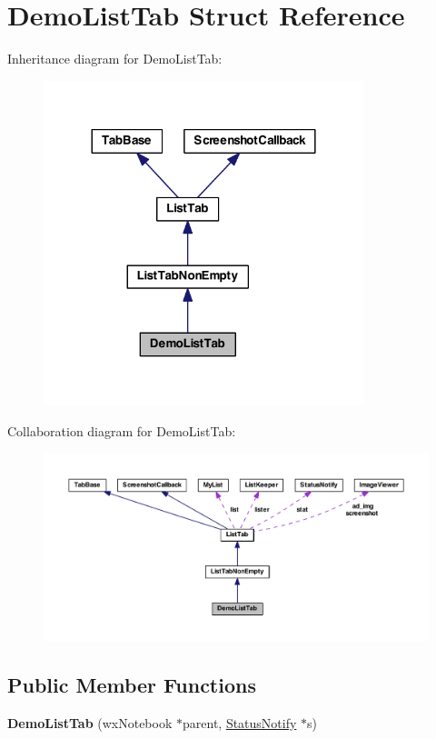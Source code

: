 \hypertarget{struct_demo_list_tab}{\section{Demo\-List\-Tab Struct Reference}
\label{struct_demo_list_tab}
}


Inheritance diagram for Demo\-List\-Tab\-:
\nopagebreak
\begin{figure}[H]
\begin{center}
\leavevmode
\includegraphics[width=264pt]{struct_demo_list_tab__inherit__graph}
\end{center}
\end{figure}


Collaboration diagram for Demo\-List\-Tab\-:
\nopagebreak
\begin{figure}[H]
\begin{center}
\leavevmode
\includegraphics[width=350pt]{struct_demo_list_tab__coll__graph}
\end{center}
\end{figure}
\subsection*{Public Member Functions}
\begin{DoxyCompactItemize}
\item 
\hypertarget{struct_demo_list_tab_af6f5f41dd3935b9f364d9512e5f43554}{{\bfseries Demo\-List\-Tab} (wx\-Notebook $\ast$parent, \hyperlink{struct_status_notify}{Status\-Notify} $\ast$s)}\label{struct_demo_list_tab_af6f5f41dd3935b9f364d9512e5f43554}

\end{DoxyCompactItemize}


